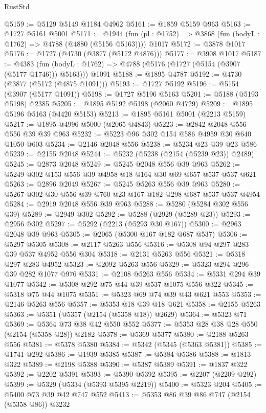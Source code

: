 \begin{lexlean}{RustStd}
\begin{coremodule}
@5159 := @5129 @5149 @1184 @4962
@5161 := @1859 @5159 @963
@5163 := @1727 @5161 @5001
@5171 := @1944
    (fun (pl : @1752) => @3868 (fun (bodyL : @1762) => @4788 (@4880 (@5156 @5163))))
    @1017
@5172 := @3878 @1017
@5176 := @1727 (@4730 (@3877 (@5172 @4876)))
@5177 := @3908 @1017
@5187 := @4383
    (fun (bodyL : @1762) => @4788 (@5176 (@1727 (@5154 (@3907 (@5177 @1746))) @5163)))
    @1091
@5188 := @1895 @4787
@5192 := @4730 (@3877 (@5172 (@4875 @1091)))
@5193 := @1727 @5192
@5196 := @5154 (@3907 (@5177 @1091))
@5198 := @1727 @5196 @5163
@5201 := @5188 (@5193 @5198) @2385
@5205 := @1895 @5192 @5198 (@2060 @4729)
@5209 := @1895 @5196 @5163 (@4420 @5153)
@5213 := @1895 @5161 @5001 (@2213 @5159)
@5217 := @1895 @4996 @5000 (@2065 @4843)
@5223 := @2842 @2048 @556 @556 @39 @39 @963
@5232 := @5223 @96 @302 @154 @586 @4959 @30 @640 @1050 @603
@5234 := @2146 @2048 @556
@5238 := @5234 @23 @39 @23 @586
@5239 := @2155 @2048
@5244 := @5232 (@5238 (@2154 (@5239 @23)) @2489)
@5245 := @2873 @2048
@5249 := @5245 @2048 @556 @39 @963
@5262 := @5249 @302 @153 @556 @39 @4958 @18 @164 @30 @69 @657 @537 @537 @621
@5263 := @2896 @2049
@5267 := @5245 @5263 @556 @39 @963
@5280 := @5267 @302 @30 @556 @39 @760 @23 @167 @182 @298 @687 @537 @537 @4954
@5284 := @2919 @2048 @556 @39 @963
@5288 := @5280 (@5284 @302 @556 @39)
@5289 := @2949 @302
@5292 := @5288 (@2929 (@5289 @23))
@5293 := @2956 @302
@5297 := @5292 (@2213 (@5293 @30 @167))
@5300 := @2963 @2048 @39 @963
@5305 := @2065 (@5300 @167 @182 @687 @537)
@5306 := @5297 @5305
@5308 := @2117 @5263 @556
@5316 := @5308 @94 @297 @283 @39 @537 @4952 @556 @304
@5318 := @2131 @5263 @556
@5321 := @5318 @297 @283 @4952
@5323 := @2092 @5263 @556
@5329 := @5323 @294 @296 @39 @282 @1077 @976
@5331 := @2108 @5263 @556
@5334 := @5331 @294 @39 @1077
@5342 := @5308 @292 @75 @44 @39 @537 @1075 @556 @322
@5345 := @5318 @75 @44 @1075
@5351 := @5323 @69 @74 @39 @43 @621 @553
@5353 := @2146 @5263 @556
@5357 := @5353 @18 @39 @18 @621
@5358 := @2155 @5263
@5363 := @5351 (@5357 (@2154 (@5358 @18)) @2629)
@5364 := @5323 @71
@5369 := @5364 @73 @38 @42 @550 @552
@5377 := @5353 @28 @38 @28 @550 (@2154 (@5358 @28)) @2182
@5378 := @5369 @5377
@5380 := @2188 @5263 @556
@5381 := @5378 @5380
@5384 := @5342 (@5345 (@5363 @5381))
@5385 := @1741 @292
@5386 := @1939 @5385
@5387 := @5384 @5386
@5388 := @1813 @322
@5389 := @2198 @5388
@5390 := @5387 @5389
@5391 := @1837 @322
@5392 := @2202 @5391
@5393 := @5390 @5392
@5395 := @2207 (@2209 @292)
@5399 := @5329 (@5334 (@5393 @5395 @2219))
@5400 := @5323 @204
@5405 := @5400 @73 @39 @42 @747 @552
@5413 := @5353 @86 @39 @86 @747 (@2154 (@5358 @86)) @3232

\end{coremodule}
\end{lexlean}

